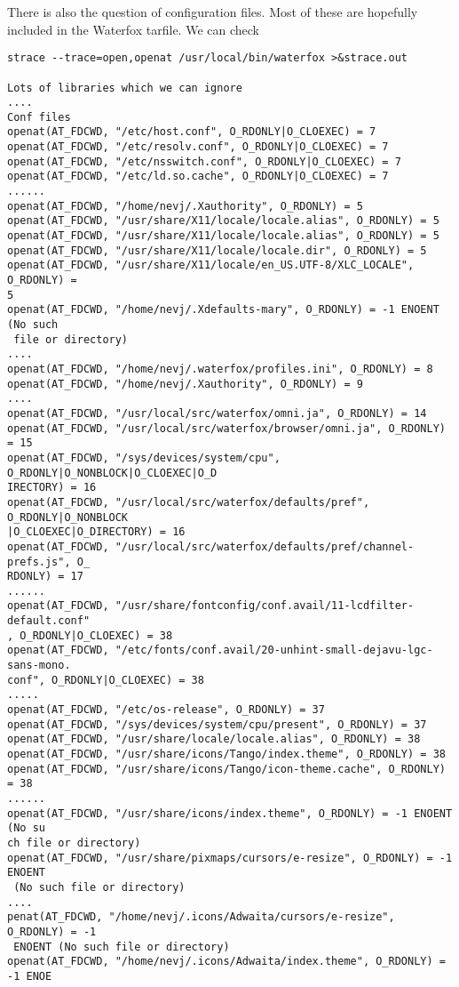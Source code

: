 \documentclass[a4paper]{article}  %
\begin{document}
There is also the question of configuration files. Most of these are hopefully included in the Waterfox tarfile. We can check
\begin{tcolorbox}
\begin{verbatim}
strace --trace=open,openat /usr/local/bin/waterfox >&strace.out

Lots of libraries which we can ignore
....
Conf files
openat(AT_FDCWD, "/etc/host.conf", O_RDONLY|O_CLOEXEC) = 7
openat(AT_FDCWD, "/etc/resolv.conf", O_RDONLY|O_CLOEXEC) = 7
openat(AT_FDCWD, "/etc/nsswitch.conf", O_RDONLY|O_CLOEXEC) = 7
openat(AT_FDCWD, "/etc/ld.so.cache", O_RDONLY|O_CLOEXEC) = 7
......
openat(AT_FDCWD, "/home/nevj/.Xauthority", O_RDONLY) = 5
openat(AT_FDCWD, "/usr/share/X11/locale/locale.alias", O_RDONLY) = 5
openat(AT_FDCWD, "/usr/share/X11/locale/locale.alias", O_RDONLY) = 5
openat(AT_FDCWD, "/usr/share/X11/locale/locale.dir", O_RDONLY) = 5
openat(AT_FDCWD, "/usr/share/X11/locale/en_US.UTF-8/XLC_LOCALE", O_RDONLY) = 
5
openat(AT_FDCWD, "/home/nevj/.Xdefaults-mary", O_RDONLY) = -1 ENOENT (No such
 file or directory)
....
openat(AT_FDCWD, "/home/nevj/.waterfox/profiles.ini", O_RDONLY) = 8
openat(AT_FDCWD, "/home/nevj/.Xauthority", O_RDONLY) = 9
....
openat(AT_FDCWD, "/usr/local/src/waterfox/omni.ja", O_RDONLY) = 14
openat(AT_FDCWD, "/usr/local/src/waterfox/browser/omni.ja", O_RDONLY) = 15
openat(AT_FDCWD, "/sys/devices/system/cpu", O_RDONLY|O_NONBLOCK|O_CLOEXEC|O_D
IRECTORY) = 16
openat(AT_FDCWD, "/usr/local/src/waterfox/defaults/pref", O_RDONLY|O_NONBLOCK
|O_CLOEXEC|O_DIRECTORY) = 16
openat(AT_FDCWD, "/usr/local/src/waterfox/defaults/pref/channel-prefs.js", O_
RDONLY) = 17
......
openat(AT_FDCWD, "/usr/share/fontconfig/conf.avail/11-lcdfilter-default.conf"
, O_RDONLY|O_CLOEXEC) = 38
openat(AT_FDCWD, "/etc/fonts/conf.avail/20-unhint-small-dejavu-lgc-sans-mono.
conf", O_RDONLY|O_CLOEXEC) = 38
.....
openat(AT_FDCWD, "/etc/os-release", O_RDONLY) = 37
openat(AT_FDCWD, "/sys/devices/system/cpu/present", O_RDONLY) = 37
openat(AT_FDCWD, "/usr/share/locale/locale.alias", O_RDONLY) = 38
openat(AT_FDCWD, "/usr/share/icons/Tango/index.theme", O_RDONLY) = 38
openat(AT_FDCWD, "/usr/share/icons/Tango/icon-theme.cache", O_RDONLY) = 38
......
openat(AT_FDCWD, "/usr/share/icons/index.theme", O_RDONLY) = -1 ENOENT (No su
ch file or directory)
openat(AT_FDCWD, "/usr/share/pixmaps/cursors/e-resize", O_RDONLY) = -1 ENOENT
 (No such file or directory)
....
penat(AT_FDCWD, "/home/nevj/.icons/Adwaita/cursors/e-resize", O_RDONLY) = -1
 ENOENT (No such file or directory)
openat(AT_FDCWD, "/home/nevj/.icons/Adwaita/index.theme", O_RDONLY) = -1 ENOE

\end{verbatim}
\end{tcolorbox}
\end{document}
